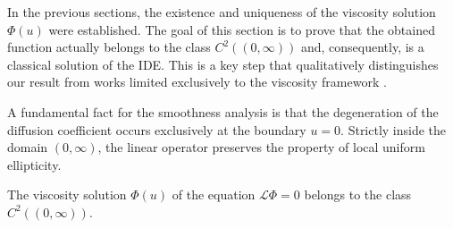 \documentclass[smallextended]{svjour3}
\begin{document}
In the previous sections, the existence and uniqueness of the viscosity solution $\Phi(u)$ were established. The goal of this section is to prove that the obtained function actually belongs to the class $C^2((0, \infty))$ and, consequently, is a classical solution of the IDE. This is a key step that qualitatively distinguishes our result from works limited exclusively to the viscosity framework \cite{BK2015}.

A fundamental fact for the smoothness analysis is that the degeneration of the diffusion coefficient occurs exclusively at the boundary $u=0$. Strictly inside the domain $(0, \infty)$, the linear operator preserves the property of local uniform ellipticity.

\begin{theorem}
\label{thm:smoothness}
The viscosity solution $\Phi(u)$ of the equation $\mathcal{L} \Phi = 0$ belongs to the class $C^2((0, \infty))$.
\end{theorem}
\end{document}
